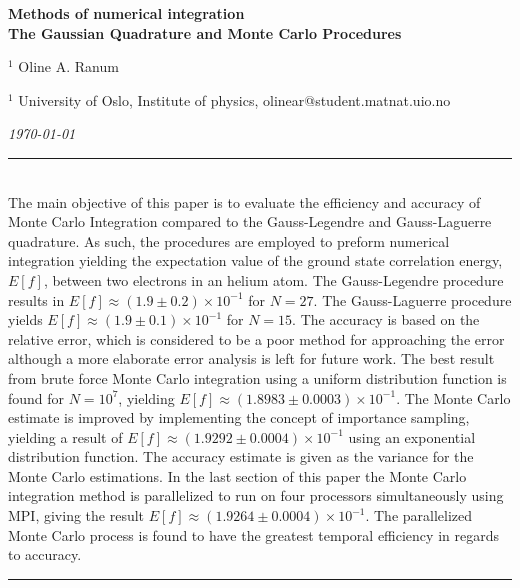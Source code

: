 \documentclass[%
reprint,nofootinbib,
amsmath,amssymb,
aps,
]{revtex4-1}
\newcommand{\HRule}{\rule{\textwidth}{0.5mm}}
\begin{document}
\onecolumngrid

\begin{center}
	\large\textbf{Methods of numerical integration\\ \small{The Gaussian Quadrature and Monte Carlo Procedures}}
\end{center}
\vspace{5mm}

\begin{center}
	\small{$^1$ Oline A. Ranum}\\
\end{center}

\begin{center}
	\small{$^1$ University of Oslo, Institute of physics, 
		olinear@student.matnat.uio.no}
\end{center}

\begin{center}
	\textit{\today}
\end{center}
\vspace{7mm}
\noindent 
\HRule \vspace{2mm}\\
The main objective of this paper is to evaluate the efficiency and accuracy of Monte Carlo Integration compared to the Gauss-Legendre and Gauss-Laguerre quadrature. As such, the procedures are employed to preform numerical integration yielding the expectation value of the ground state correlation energy, $E[f]$, between two electrons in an helium atom. The Gauss-Legendre procedure results in $E[f] \approx (1.9 \pm 0.2)\times 10^{-1}$ for $N=27$. The Gauss-Laguerre procedure yields $E[f]\approx (1.9 \pm 0.1)\times 10^{-1}$ for $N=15$. The accuracy is based on the relative error, which is considered to be a poor method for approaching the error although a more elaborate error analysis is left for future work. The best result from brute force Monte Carlo integration using a uniform distribution function is found for $N=10^7$, yielding $E[f]\approx (1.8983 \pm 0.0003)\times 10^{-1}$. The Monte Carlo estimate is improved by implementing the concept of importance sampling, yielding a result of $E[f]\approx (1.9292 \pm 0.0004)\times 10^{-1}$ using an exponential distribution function. The accuracy estimate is given as the variance for the Monte Carlo estimations. In the last section of this paper the Monte Carlo integration method is parallelized to run on four processors simultaneously using MPI, giving the result $E[f]\approx (1.9264 \pm 0.0004)\times 10^{-1}$. The parallelized Monte Carlo process is found to have the greatest temporal efficiency in regards to accuracy. 
\vspace{1.5mm}  \\
\HRule
\vspace{0.3cm}
\end{document}
